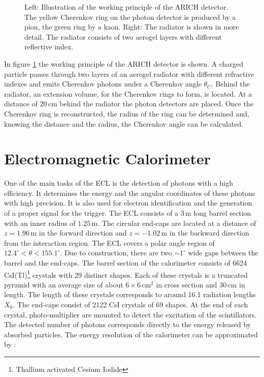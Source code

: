 \documentclass[a4paper,11pt,twosided,final,german,openbib,pdftex,listof=totoc,bibliography=totoc]{scrbook}
\begin{document}
\begin{figure}[h!]
	\caption[ARICH]{Left: Illustration of the working principle of the ARICH detector. The yellow Cherenkov ring on the photon detector is produced by a pion, the green ring by a kaon. Right: The radiator is shown in more detail. The radiator consists of two aerogel layers with different reflective index. \cite{TORASSA} }
\label{fig:ARICH}
\end{figure}

In figure \ref{fig:ARICH} the working principle of the ARICH detector is shown. A charged particle passes through two layers of an aerogel radiator with different refractive indexes and emits Cherenkov photons under a Cherenkov angle $\theta_C$. Behind the radiator, an extension volume, for the Cherenkov rings to form, is located. At a distance of $20\,\textrm{cm}$ behind the radiator the photon detectors are placed.\cite{B2TR} Once the Cherenkov ring is reconstructed, the radius of the ring can be determined and, knowing the distance and the radius, the Cherenkov angle can be calculated.

\section{Electromagnetic Calorimeter}
\label{sec:ECL}

One of the main tasks of the ECL is the detection of photons with a high efficiency. It determines the energy and the angular coordinates of these photons with high precision. It is also used for electron identification and the generation of a proper signal for the trigger. The ECL consists of a $3\,\textrm{m}$ long barrel section with an inner radius of $1.25\,\textrm{m}$. The circular end-caps are located at a distance of $z=1.96\,\textrm{m}$ in the forward direction and $z=-1.02\,\textrm{m}$ in the backward direction from the interaction region. The ECL covers a polar angle region of $12.4^{\circ} < \theta < 155.1^{\circ}$. Due to construction, there are two $ \sim 1^{\circ}$ wide gaps between the barrel and the end-caps. The barrel section of the calorimeter consists of 6624 CsI(Tl)\footnote{Thallium activated Cesium Iodide} crystals with 29 distinct shapes. Each of these crystals is a truncated pyramid with an average size of about $6\times6 \, \textrm{cm}^2$ in cross section and $30\,\textrm{cm}$ in length. The length of these crystals corresponds to around 16.1 radiation lengths $X_0$. The end-caps consist of 2122 CsI crystals of 69 shapes. At the end of each crystal, photo-multiplier are mounted to detect the excitation of the scintillators. The detected number of photons corresponds directly to the energy released by absorbed particles.
The energy resolution of the calorimeter can be approximated by \cite{B2TR} \cite{Belle_ECL_2015}:
\end{document}
